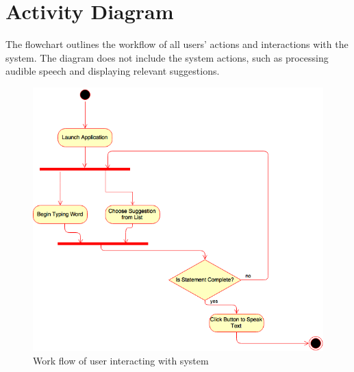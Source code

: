 \chapter{Activity Diagram}

The flowchart  outlines the workflow of all users' actions and interactions with the system. The diagram does not include the system actions, such as processing audible speech and displaying relevant suggestions.

\begin{figure}[htb]
\centering
\includegraphics[width=\textwidth]{ActivityDiagram.png}
\caption{Work flow of user interacting with system}
\label{fig:activityDiagram}
\end{figure}